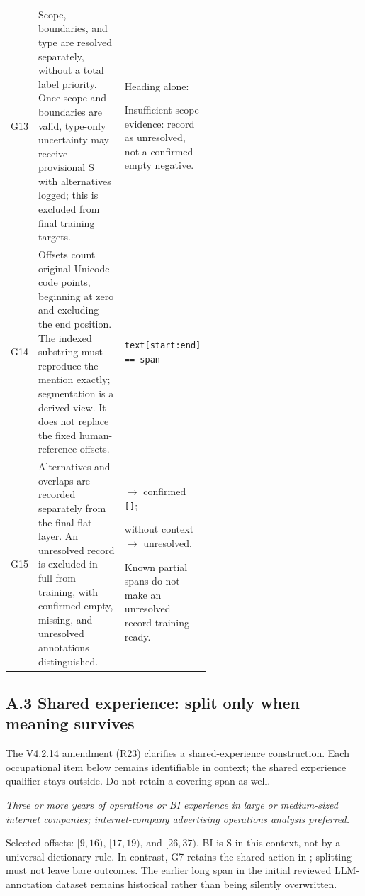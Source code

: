 \begin{table}[H]
\begin{tabular}{@{}P{0.07\linewidth}P{0.49\linewidth}P{\linewidth-16pt\relax}@{}}
G13 & Scope, boundaries, and type are resolved separately, without a total label priority. Once scope and boundaries are valid, type-only uncertainty may receive provisional S with alternatives logged; this is excluded from final training targets. & Heading alone: \par\smallskip Insufficient scope evidence: record as unresolved, not a confirmed empty negative. \\[5pt]
G14 & Offsets count original Unicode code points, beginning at zero and excluding the end position. The indexed substring must reproduce the mention exactly; segmentation is a derived view. It does not replace the fixed human-reference offsets. & \texttt{text[start:end] == span}\par\smallskip {} \\[5pt]
G15 & Alternatives and overlaps are recorded separately from the final flat layer. An unresolved record is excluded in full from training, with confirmed empty, missing, and unresolved annotations distinguished. &  $\rightarrow$ confirmed \texttt{[]};\par\smallskip{} without context $\rightarrow$ unresolved.\par\smallskip Known partial spans do not make an unresolved record training-ready. \\
\bottomrule
\end{tabular}
\end{table}
\endgroup

\subsection{A.3 Shared experience: split only when meaning survives}
The V4.2.14 amendment (R23) clarifies a shared-experience construction. Each occupational item below remains identifiable in context; the shared experience qualifier stays outside. Do not retain a covering span as well.

\smallskip\noindent
\begin{minipage}{\linewidth}\small\RaggedRight
{}
\par\smallskip
\textit{Three or more years of operations or BI experience in large or medium-sized internet companies; internet-company advertising operations analysis preferred.}
\par\smallskip
Selected offsets: $[9,16)$, $[17,19)$, and $[26,37)$. BI is S in this context, not by a universal dictionary rule. In contrast, G7 retains the shared action in ; splitting must not leave bare outcomes. The earlier long span in the initial reviewed LLM-annotation dataset remains historical rather than being silently overwritten.
\end{minipage}

